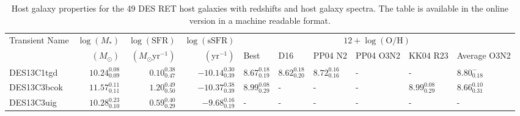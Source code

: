 \documentclass[fleqn,usenatbib,]{mnras}
\begin{document}
\begin{table}

\caption{Host galaxy properties for the 49 DES RET host galaxies with redshifts and host galaxy spectra. The table is available in the online version in a machine readable format.}
\begin{threeparttable}
\begin{tabular}{lrrrllllll}
\toprule
Transient Name &$\log \left(M_*\right)$ &$\log \left(\mathrm{SFR}\right)$ &  $\log \left(\mathrm{sSFR}\right)$ &                                                           \multicolumn{6}{c}{$12+\log\left(\mathrm{O/H}\right) $}\\
{} & $\left( M_{\odot}\right)$ & $\left(M_{\odot} \mathrm{yr}^{-1}\right)$&$\left(\mathrm{yr}^{-1} \right)$& Best\tnote{a} &                                                           D16 &                                                       PP04 N2 &                                                     PP04 O3N2 &                                                      KK04 R23 &                                                   Average O3N2\tnote{b}\\
\midrule
DES13C1tgd  &  $10.24 _{\scriptscriptstyle 0.09} ^{\scriptscriptstyle 0.08}$ &   $0.10 _{\scriptscriptstyle 0.47} ^{\scriptscriptstyle 0.38}$ &  $-10.14 _{\scriptscriptstyle 0.39} ^{\scriptscriptstyle 0.30}$ &  $8.67 _{\scriptscriptstyle 0.19} ^{\scriptscriptstyle 0.18}$ &  $8.62 _{\scriptscriptstyle 0.20} ^{\scriptscriptstyle 0.18}$ &  $8.72 _{\scriptscriptstyle 0.16} ^{\scriptscriptstyle 0.16}$ &                                                             - &                                                             - &     $8.80 _{\scriptscriptstyle 0.18} ^{\scriptscriptstyle -}$ \\
DES13C3bcok &  $11.57 _{\scriptscriptstyle 0.11} ^{\scriptscriptstyle 0.11}$ &   $1.20 _{\scriptscriptstyle 0.50} ^{\scriptscriptstyle 0.49}$ &  $-10.37 _{\scriptscriptstyle 0.39} ^{\scriptscriptstyle 0.38}$ &  $8.99 _{\scriptscriptstyle 0.29} ^{\scriptscriptstyle 0.08}$ &                                                             - &                                                             - &                                                             - &  $8.99 _{\scriptscriptstyle 0.29} ^{\scriptscriptstyle 0.08}$ &  $8.66 _{\scriptscriptstyle 0.31} ^{\scriptscriptstyle 0.10}$ \\
DES13C3uig  &  $10.28 _{\scriptscriptstyle 0.10} ^{\scriptscriptstyle 0.23}$ &   $0.59 _{\scriptscriptstyle 0.29} ^{\scriptscriptstyle 0.40}$ &   $-9.68 _{\scriptscriptstyle 0.19} ^{\scriptscriptstyle 0.16}$ &                                                             - &                                                             - &                                                             - &                                                             - &                                                             - &                                                             - \\

\end{tabular}
\end{threeparttable}
\end{table}
\end{document}
